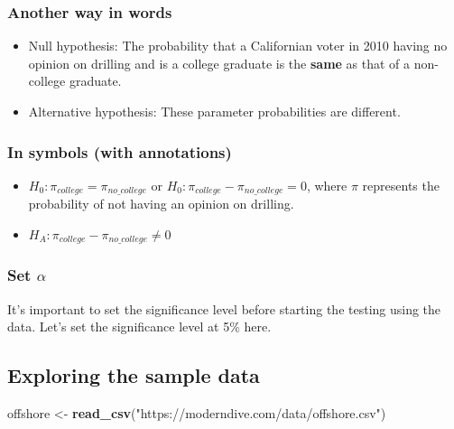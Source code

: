 \documentclass[12pt,]{krantz}
\makeatletter
\newenvironment{Shaded}{\begin{snugshade}}{\end{snugshade}}
\newcommand{\KeywordTok}[1]{\textcolor[rgb]{0.27,0.27,0.27}{\textbf{#1}}}
\newcommand{\StringTok}[1]{\textcolor[rgb]{0.5,0.5,0.5}{#1}}
\newcommand{\NormalTok}[1]{#1}
\providecommand{\tightlist}{%
  \setlength{\itemsep}{0pt}\setlength{\parskip}{0pt}}
\newenvironment{kframe}{%
\medskip{}
\setlength{\fboxsep}{.8em}
 \def\at@end@of@kframe{}%
 \ifinner\ifhmode%
  \def\at@end@of@kframe{\end{minipage}}%
  \begin{minipage}{\columnwidth}%
 \fi\fi%
 \def\FrameCommand##1{\hskip\@totalleftmargin \hskip-\fboxsep
 \colorbox{shadecolor}{##1}\hskip-\fboxsep
     \hskip-\linewidth \hskip-\@totalleftmargin \hskip\columnwidth}%
 \MakeFramed {\advance\hsize-\width
   \@totalleftmargin\z@ \linewidth\hsize
   \@setminipage}}%
 {\par\unskip\endMakeFramed%
 \at@end@of@kframe}
\renewenvironment{Shaded}{\begin{kframe}}{\end{kframe}}
\makeatother
\begin{document}
\subsubsection*{Another way in words}\label{another-way-in-words}


\begin{itemize}
\item
  Null hypothesis: The probability that a Californian voter in 2010
  having no opinion on drilling and is a college graduate is the
  \textbf{same} as that of a non-college graduate.
\item
  Alternative hypothesis: These parameter probabilities are different.
\end{itemize}

\subsubsection*{In symbols (with
annotations)}\label{in-symbols-with-annotations-2}


\begin{itemize}
\tightlist
\item
  \(H_0: \pi_{college} = \pi_{no\_college}\) or
  \(H_0: \pi_{college} - \pi_{no\_college} = 0\), where \(\pi\)
  represents the probability of not having an opinion on drilling.
\item
  \(H_A: \pi_{college} - \pi_{no\_college} \ne 0\)
\end{itemize}

\subsubsection*{\texorpdfstring{Set
\(\alpha\)}{Set \textbackslash{}alpha}}\label{set-alpha-2}


It's important to set the significance level before starting the testing
using the data. Let's set the significance level at 5\% here.

\subsection{Exploring the sample
data}\label{exploring-the-sample-data-2}

\begin{Shaded}
\begin{Highlighting}[]
\NormalTok{offshore <-}\StringTok{ }\KeywordTok{read_csv}\NormalTok{(}\StringTok{"https://moderndive.com/data/offshore.csv"}\NormalTok{)}
\end{Highlighting}
\end{Shaded}
\end{document}
